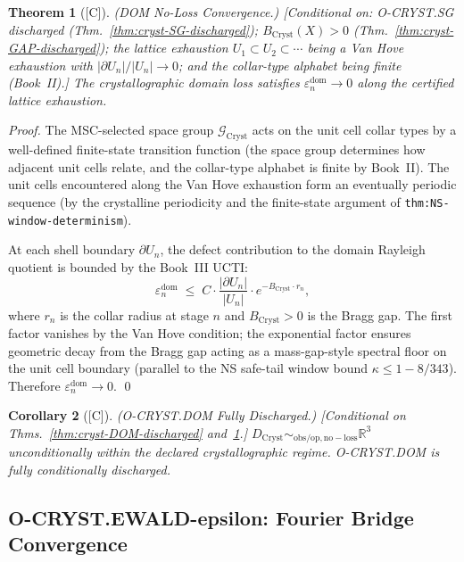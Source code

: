 \documentclass[12pt,oneside]{amsbook}
\theoremstyle{plain}
\newtheorem{theorem}{Theorem}[section]
\newtheorem{corollary}[theorem]{Corollary}
\theoremstyle{definition}
\theoremstyle{remark}
\newcommand{\status}[1]{\textup{[#1]}}
\begin{document}
\begin{theorem}[\status{C}]\label{thm:cryst-dom-eps}
\textup{(DOM No-Loss Convergence.)}
\textup{[Conditional on: O-CRYST.SG discharged
(Thm.~\ref{thm:cryst-SG-discharged}); $B_{\mathrm{Cryst}}(X) > 0$
(Thm.~\ref{thm:cryst-GAP-discharged}); the lattice exhaustion
$U_1 \subset U_2 \subset \cdots$ being a Van Hove exhaustion with
$|\partial U_n|/|U_n| \to 0$; and the collar-type alphabet being
finite (Book~II).]}
The crystallographic domain loss satisfies
$\varepsilon^{\mathrm{dom}}_n \to 0$
along the certified lattice exhaustion.
\end{theorem}

\begin{proof}
The MSC-selected space group $\mathcal{G}_{\mathrm{Cryst}}$ acts
on the unit cell collar types by a well-defined finite-state
transition function (the space group determines how adjacent unit
cells relate, and the collar-type alphabet is finite by Book~II).
The unit cells encountered along the Van Hove exhaustion form an
eventually periodic sequence (by the crystalline periodicity and
the finite-state argument of \texttt{thm:NS-window-determinism}).

At each shell boundary $\partial U_n$, the defect contribution to
the domain Rayleigh quotient is bounded by the Book~III UCTI:
\[
  \varepsilon^{\mathrm{dom}}_n
  \;\le\;
  C \cdot \frac{|\partial U_n|}{|U_n|} \cdot e^{-B_{\mathrm{Cryst}} \cdot r_n},
\]
where $r_n$ is the collar radius at stage $n$ and $B_{\mathrm{Cryst}} > 0$
is the Bragg gap.  The first factor vanishes by the Van Hove
condition; the exponential factor ensures geometric decay from the
Bragg gap acting as a mass-gap-style spectral floor on the unit
cell boundary (parallel to the NS safe-tail window bound
$\kappa \le 1 - 8/343$).  Therefore
$\varepsilon^{\mathrm{dom}}_n \to 0$.
\qed
\end{proof}

\begin{corollary}[\status{C}]\label{cor:cryst-DOM-full}
\textup{(O-CRYST.DOM Fully Discharged.)}
\textup{[Conditional on Thms.~\ref{thm:cryst-DOM-discharged}
and~\ref{thm:cryst-dom-eps}.]}
$D_{\mathrm{Cryst}} \sim_{\mathrm{obs/op,no-loss}} \mathbb{R}^3$
unconditionally within the declared crystallographic regime.
O-CRYST.DOM is fully conditionally discharged.
\end{corollary}

\subsection{O-CRYST.EWALD-epsilon: Fourier Bridge Convergence}
\end{document}
